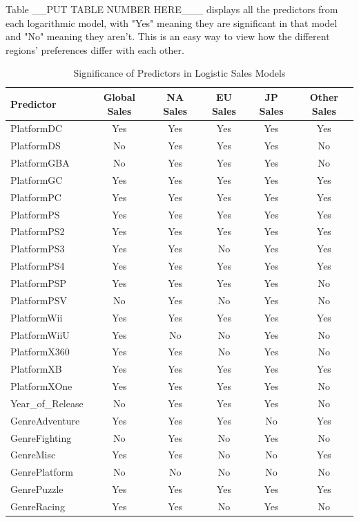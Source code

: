 \documentclass[12pt]{article}
\begin{document}
Table __PUT TABLE NUMBER HERE___ displays all the predictors from each logarithmic model, with "Yes" meaning they are significant in 
that model and "No" meaning they aren't. This is an easy way to view how the different regions' preferences differ with each other. 
\begin{table}[ht]
  \caption{Significance of Predictors in Logistic Sales Models}
  \label{tab:significance}
  \centering
  \begin{tabular}{lccccc}
    \hline
    Predictor & Global Sales & NA Sales & EU Sales & JP Sales & Other Sales \\
    \hline
    PlatformDC & Yes & Yes & Yes & Yes & Yes \\
    PlatformDS & No & Yes & Yes & Yes & No \\
    PlatformGBA & No & Yes & Yes & Yes & No \\
    PlatformGC & Yes & Yes & Yes & Yes & Yes \\
    PlatformPC & Yes & Yes & Yes & Yes & Yes \\
    PlatformPS & Yes & Yes & Yes & Yes & Yes \\
    PlatformPS2 & Yes & Yes & Yes & Yes & Yes \\
    PlatformPS3 & Yes & Yes & No & Yes & Yes \\
    PlatformPS4 & Yes & Yes & Yes & Yes & Yes \\
    PlatformPSP & Yes & Yes & Yes & Yes & No \\
    PlatformPSV & No & Yes & No & Yes & No \\
    PlatformWii & Yes & Yes & Yes & Yes & Yes \\
    PlatformWiiU & Yes & No & No & Yes & No \\
    PlatformX360 & Yes & Yes & No & Yes & No \\
    PlatformXB & Yes & Yes & Yes & Yes & Yes \\
    PlatformXOne & Yes & Yes & Yes & Yes & No \\
    Year\_of\_Release & No & Yes & Yes & Yes & No \\
    GenreAdventure & Yes & Yes & Yes & No & Yes \\
    GenreFighting & No & Yes & No & Yes & No \\
    GenreMisc & Yes & Yes & No & No & Yes \\
    GenrePlatform & No & No & No & No & No \\
    GenrePuzzle & Yes & Yes & Yes & Yes & Yes \\
    GenreRacing & Yes & Yes & No & Yes & No \\

\end{tabular}
\end{table}
\end{document}
